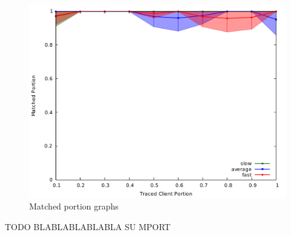\begin{figure}[H]
\includegraphics[scale=0.35]{graphs/c_tclient_mport.pdf}
\caption{Matched portion graphs}
\label{fig:g_mport}
\end{figure}
TODO BLABLABLABLABLA SU MPORT



